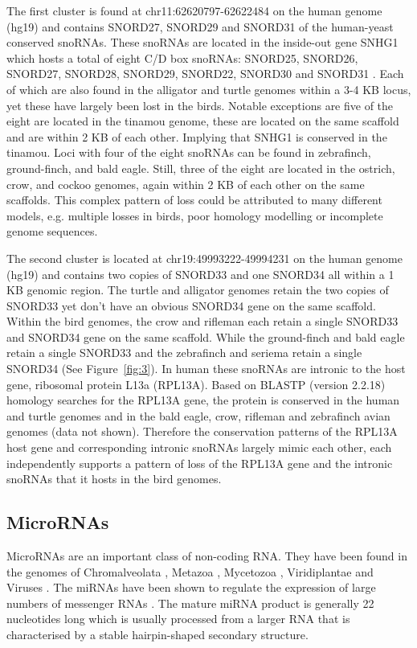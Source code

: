 \documentclass[10pt]{bmc_article}
\newenvironment{bmcformat}{\begin{raggedright}\baselineskip20pt\sloppy\setboolean{publ}{false}}{\end{raggedright}\baselineskip20pt\sloppy}
\begin{document}
\begin{bmcformat}
The first cluster is found at chr11:62620797-62622484 on the human
genome (hg19) and contains SNORD27, SNORD29 and SNORD31 of the
human-yeast conserved snoRNAs. These snoRNAs are located in the
inside-out gene SNHG1 which hosts a total of eight C/D box snoRNAs:
SNORD25, SNORD26, SNORD27, SNORD28, SNORD29, SNORD22, SNORD30 and
SNORD31 \cite{Tycowski:1996}. Each of which are also found in the
alligator and turtle genomes within a 3-4 KB locus, yet these have
largely been lost in the birds. Notable exceptions are five of the
eight are located in the tinamou genome, these are located on the same
scaffold and are within 2 KB of each other. Implying that SNHG1 is
conserved in the tinamou. Loci with four of the eight snoRNAs can be
found in zebrafinch, ground-finch, and bald eagle. Still, three of the
eight are located in the ostrich, crow, and cockoo genomes, again
within 2 KB of each other on the same scaffolds. This complex pattern
of loss could be attributed to many different models, e.g. multiple
losses in birds, poor homology modelling or incomplete genome
sequences.


The second cluster is located at chr19:49993222-49994231 on the human
genome (hg19) and contains two copies of SNORD33 and one SNORD34 all
within a 1 KB genomic region. The turtle and alligator genomes retain
the two copies of SNORD33 yet don't have an obvious SNORD34 gene on
the same scaffold. Within the bird genomes, the crow and rifleman each
retain a single SNORD33 and SNORD34 gene on the same scaffold. While
the ground-finch and bald eagle retain a single SNORD33 and the
zebrafinch and seriema retain a single SNORD34 (See
Figure~\ref{fig:3}).  In human these snoRNAs are intronic to the host
gene, ribosomal protein L13a (RPL13A). Based on BLASTP (version
2.2.18) homology searches for the RPL13A gene, the protein is
conserved in the human and turtle genomes and in the bald eagle, crow,
rifleman and zebrafinch avian genomes (data not shown). Therefore the
conservation patterns of the RPL13A host gene and corresponding
intronic snoRNAs largely mimic each other, each independently supports
a pattern of loss of the RPL13A gene and the intronic snoRNAs that it
hosts in the bird genomes.


\subsection*{MicroRNAs}
MicroRNAs are an important class of non-coding RNA. They have been
found in the genomes of Chromalveolata \cite{Cock:2010,Huang:2011},
Metazoa \cite{Lee:1993,Lau:2001,Hertel:2006}, Mycetozoa
\cite{Hinas:2007,Avesson:2012}, Viridiplantae
\cite{Reinhart:2002,Fattash:2007,Axtell:2007,Molnar:2007} and Viruses
\cite{Pfeffer:2004,Ouellet:2008,Pfeffer:2005,Landgraf:2007}. The
miRNAs have been shown to regulate the expression of large numbers of
messenger RNAs \cite{Lim:2005}. The mature miRNA product is generally
22 nucleotides long which is usually processed from a larger RNA that
is characterised by a stable hairpin-shaped secondary structure.


\end{bmcformat}
\end{document}
